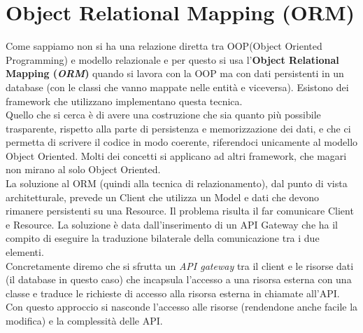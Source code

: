 \section{Object Relational Mapping (ORM)}
Come sappiamo non si ha una relazione diretta tra OOP(Object Oriented Programming) e modello relazionale e per questo si usa l'\textbf{Object Relational Mapping (\textit{ORM})} quando si lavora con la OOP ma con dati persistenti in un database (con le classi che vanno mappate nelle entità e viceversa). Esistono dei framework che utilizzano implementano questa tecnica.\\
Quello che si cerca è di avere una costruzione che sia quanto più possibile trasparente, rispetto alla parte di persistenza e memorizzazione dei dati, e che ci permetta di scrivere il codice in modo coerente, riferendoci unicamente al modello Object Oriented. Molti dei concetti si applicano ad altri framework, che magari non mirano al solo Object Oriented.\\
La soluzione al ORM (quindi alla tecnica di relazionamento), dal punto di vista architetturale, prevede un Client che utilizza un Model e dati che devono rimanere persistenti su una Resource. Il problema risulta il far comunicare Client e Resource. La soluzione è data dall'inserimento di un API Gateway che ha il compito di eseguire la traduzione bilaterale della comunicazione tra i due elementi.\\
Concretamente diremo che si sfrutta un \textit{API gateway} tra il client e le risorse dati (il database in questo caso) che incapsula l'accesso a una risorsa esterna con una classe e traduce le richieste di accesso alla risorsa esterna in chiamate all'API. Con questo approccio si nasconde l'accesso alle risorse (rendendone anche facile la modifica) e la complessità delle API.

